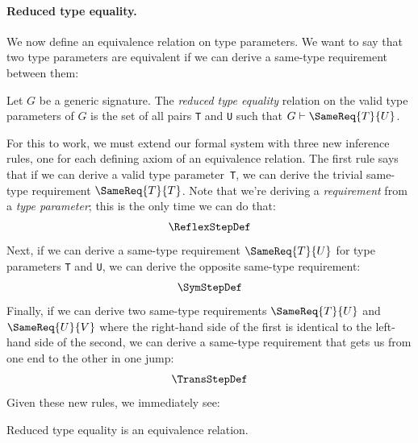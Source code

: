 \documentclass[../generics]{subfiles}
\begin{document}
\paragraph{Reduced type equality.} We now define an equivalence relation on type parameters. We want to say that two type parameters are equivalent if we can derive a same-type requirement between them:

\begin{definition}
Let $G$ be a generic signature. The \emph{reduced type equality} relation on the valid type parameters of $G$ is the set of all pairs \texttt{T} and \texttt{U} such that $G\vdash\SameReq{T}{U}$.
\end{definition}

For this to work, we must extend our formal system with three new inference rules, one for each defining axiom of an equivalence relation. The first rule says that if we can derive a valid type parameter~\texttt{T}, we can derive the trivial same-type requirement $\SameReq{T}{T}$. Note that we're deriving a \emph{requirement} from a \emph{type parameter}; this is the only time we can do that:
\begin{gather*}
\ReflexStepDef
\end{gather*}
Next, if we can derive a same-type requirement $\SameReq{T}{U}$ for type parameters \texttt{T} and \texttt{U}, we can derive the opposite same-type requirement:
\begin{gather*}
\SymStepDef
\end{gather*}
Finally, if we can derive two same-type requirements $\SameReq{T}{U}$ and $\SameReq{U}{V}$ where the right-hand side of the first is identical to the left-hand side of the second, we can derive a same-type requirement that gets us from one end to the other in one jump:
\begin{gather*}
\TransStepDef
\end{gather*}
Given these new rules, we immediately see:
\begin{proposition}
Reduced type equality is an equivalence relation.
\end{proposition}
\end{document}

